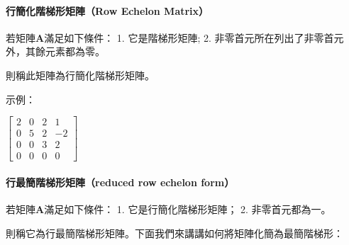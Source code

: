 \documentclass[11pt]{article}
\begin{document}
{    \hypertarget{ux884cux7c21ux5316ux968eux68afux5f62ux77e9ux9663row-echelon-matrix}{%
\paragraph{行簡化階梯形矩陣（Row Echelon
Matrix）}\label{ux884cux7c21ux5316ux968eux68afux5f62ux77e9ux9663row-echelon-matrix}}

若矩陣\(\mathbf{A}\)滿足如下條件： 1. 它是階梯形矩陣; 2.
非零首元所在列出了非零首元外，其餘元素都為零。

則稱此矩陣為行簡化階梯形矩陣。

    示例：

\(\begin{bmatrix} 2 & 0 & 2 & 1 \\ 0 & 5 & 2 & -2 \\ 0 & 0 & 3 & 2 \\ 0 & 0 & 0 & 0 \end{bmatrix}\)

    \hypertarget{ux884cux6700ux7c21ux968eux68afux5f62ux77e9ux9663reduced-row-echelon-form}{%
\paragraph{行最簡階梯形矩陣（reduced row echelon
form）}\label{ux884cux6700ux7c21ux968eux68afux5f62ux77e9ux9663reduced-row-echelon-form}}

若矩陣\(\mathbf{A}\)滿足如下條件： 1. 它是行簡化階梯形矩陣； 2.
非零首元都為一。

則稱它為行最簡階梯形矩陣。下面我們來講講如何將矩陣化簡為最簡階梯形：

}
\end{document}
